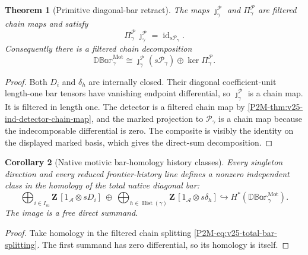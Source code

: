 \documentclass[11pt]{article}
\newtheorem{theorem}{Theorem}[section]
\newtheorem{corollary}[theorem]{Corollary}
\theoremstyle{remark}
\newcommand{\Z}{\mathbf Z}
\newcommand{\Mot}{\mathrm{Mot}}
\begin{document}
\begin{theorem}[Primitive diagonal-bar retract]
\label{P2M-thm:v25-primitive-bar-retract}
The maps
\(\jmath_\gamma^{\mathscr P}\) and
\(\Pi_\gamma^{\mathscr P}\) are filtered chain maps and satisfy
\begin{equation}
 \boxed{
 \Pi_\gamma^{\mathscr P}\,
 \jmath_\gamma^{\mathscr P}
 =
 \operatorname{id}_{s\mathscr P_\gamma}.}
\end{equation}
Consequently there is a filtered chain decomposition
\begin{equation}\label{P2M-eq:v25-total-bar-splitting}
 \boxed{
 \mathbb{DBar}_\gamma^{\Mot}
 \cong
 \jmath_\gamma^{\mathscr P}(s\mathscr P_\gamma)
 \oplus
 \ker\Pi_\gamma^{\mathscr P}.}
\end{equation}
\end{theorem}

\begin{proof}
Both \(D_i\) and \(\delta_h\) are internally closed.  Their diagonal
coefficient-unit length-one bar tensors have vanishing endpoint differential,
so \(\jmath_\gamma^{\mathscr P}\) is a chain map.  It is filtered in length
one.  The detector is a filtered chain map by
\cref{P2M-thm:v25-ind-detector-chain-map}, and the marked projection to
\(\mathscr P_\gamma\) is a chain map because the indecomposable differential is
zero.  The composite is visibly the identity on the displayed marked basis,
which gives the direct-sum decomposition.
\end{proof}

\begin{corollary}[Native motivic bar-homology history classes]
\label{P2M-cor:v25-native-bar-history-classes}
Every singleton direction and every reduced frontier-history line defines a
nonzero independent class in the homology of the total native diagonal bar:
\begin{equation}
 \boxed{
 \bigoplus_{i\in I_m}\Z\,
 [1_{\mathscr A}\otimes sD_i]
 \ \oplus\
 \bigoplus_{h\in\operatorname{Hist}(\gamma)}\Z\,
 [1_{\mathscr A}\otimes s\delta_h]
 \hookrightarrow
 H^*\!\left(\mathbb{DBar}_\gamma^{\Mot}\right).}
\end{equation}
The image is a free direct summand.
\end{corollary}

\begin{proof}
Take homology in the filtered chain splitting
\eqref{P2M-eq:v25-total-bar-splitting}.  The first summand has zero differential,
so its homology is itself.
\end{proof}
\end{document}

